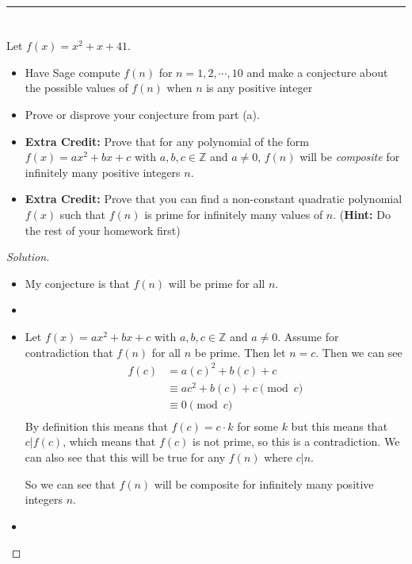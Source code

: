 \documentclass[11pt]{article}
\newcommand{\Z}{\mathbb{Z}}
\newcommand{\bline}{\noindent\rule[0.5ex]{\linewidth}{1pt}}
\newenvironment{problem}[2][Problem]{\begin{trivlist}
\item[\hskip \labelsep {\bfseries #1}\hskip \labelsep {\bfseries #2.}]}{\end{trivlist}}
\newenvironment{solution}
  {\renewcommand\qedsymbol{$~$}\begin{proof}[Solution]$ $\par\nobreak\ignorespaces}
  {\end{proof}}
\begin{document}
\bline

\section{}
\begin{problem}{}
Let $f(x) = x^2+x+41$.
\begin{itemize}
  \item [(a)] Have Sage compute $f(n)$ for $n=1,2,\cdots, 10$ and make a conjecture about the possible values of $f(n)$ when $n$ is any positive integer
  \item [(b)] Prove or disprove your conjecture from part (a).
  \item [(c)] \textbf{Extra Credit:} Prove that for any polynomial of the form $f(x)=ax^2+bx+c$ with $a,b,c\in\Z$ and $a\neq 0$, $f(n)$ will be \textit{composite} for infinitely many positive integers $n$.
  \item [(d)] \textbf{Extra Credit:} Prove that you can find a non-constant quadratic polynomial $f(x)$ such that $f(n)$ is prime for infinitely many values of $n$. (\textbf{Hint:} Do the rest of your homework first)
\end{itemize}
\end{problem}

\begin{solution}
  \begin{itemize}
    \item [(a)]
          

          
          My conjecture is that $f(n)$ will be prime for all $n$.
    \item [(b)]
          

          
    \item [(c)] Let $f(x)=ax^2+bx+c$ with $a,b,c\in\Z$ and $a\neq 0$. Assume for contradiction that $f(n)$ for all $n$ be prime. Then let $n=c$. Then we can see
          \begin{align*}
            f(c) & = a(c)^2 + b(c) + c             \\
                 & \equiv ac^2 + b(c) + c \pmod{c} \\
                 & \equiv 0 \pmod{c}               \\
          \end{align*}
          By definition this means that $f(c)= c\cdot k$ for some $k$ but this means that $c|f(c)$, which means that $f(c)$ is not prime, so this is a contradiction. We can also see that this will be true for any $f(n)$ where $c|n$.

          So we can see that $f(n)$ will be composite for infinitely many positive integers $n$.
    \item [(d)]
  \end{itemize}
\end{solution}
\end{document}
